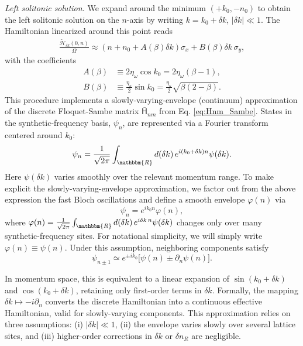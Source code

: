 \documentclass[prl,twocolumn,floatfix,10pt,superscriptaddress]{revtex4-2}
\newcommand{\mcl}[1]{\mathcal{#1}}
\begin{document}
\emph{Left solitonic solution.}
We expand around the minimum $(+k_0,-n_0)$ to obtain the left solitonic solution on the $n$-axis by writing $k=k_0+\delta k$, $|\delta k|\ll1$. The Hamiltonian linearized around this point reads
\begin{align}
\frac{\tilde{\mcl{H}}_{\delta k}(0,n)}{\Omega}\approx(n+n_0 + A(\beta)\delta k)\sigma_x
+B(\beta)\delta k\,\sigma_y,
\end{align}
with the coefficients %
\begin{align}
A(\beta)&\equiv2\eta_\omega\cos k_0=2\eta_\omega(\beta-1),\\
B(\beta)&\equiv\frac{\eta_\kappa}{2}\sin k_0=\frac{\eta_\kappa}{2}\sqrt{\beta(2-\beta)}.
\end{align}
This procedure implements a slowly-varying-envelope (continuum) approximation of the discrete Floquet-Sambe matrix $\bar{\mathsf{H}}_{n m}$ from Eq. \eqref{eq:Hnm_Sambe}. States in the synthetic-frequency basis, $\psi_n$, are represented via a Fourier transform centered around $k_0$:
\begin{align}
    \psi_n=\frac{1}{\sqrt{2\pi}}\int_{\mathbbm{R}} d(\delta k)\,e^{i(k_0+\delta k)n}\psi(\delta k).
\end{align}
Here $\psi(\delta k)$ varies smoothly over the relevant momentum range. To make explicit the slowly-varying-envelope approximation, we factor out from the above expression the fast Bloch oscillations and define a smooth envelope $\varphi(n)$ via
\begin{equation}
\psi_n = e^{ik_0 n} \varphi(n),
\end{equation}
where $\varphi(n)=\frac{1}{\sqrt{2\pi}}\int_{\mathbbm{R}} d(\delta k)\,e^{i\delta k\,n}\psi(\delta k)$ changes only over many synthetic-frequency sites. For notational simplicity, we will simply write $\varphi(n)\equiv \psi(n)$. Under this assumption, neighboring components satisfy
\begin{equation}
\psi_{n\pm1} \simeq e^{\pm ik_0}\big[\psi(n) \pm \partial_n \psi(n)\big].
\end{equation}

In momentum space, this is equivalent to a linear expansion of $\sin(k_0+\delta k)$ and $\cos(k_0+\delta k)$, retaining only first-order terms in $\delta k$. Formally, the mapping $\delta k \mapsto -i\partial_n$ converts the discrete Hamiltonian into a continuous effective Hamiltonian, valid for slowly-varying components. This approximation relies on three assumptions: (i) $|\delta k|\ll 1$, (ii) the envelope varies slowly over several lattice sites, and (iii) higher-order corrections in $\delta k$ or $\delta n_R$ are negligible.
\end{document}

